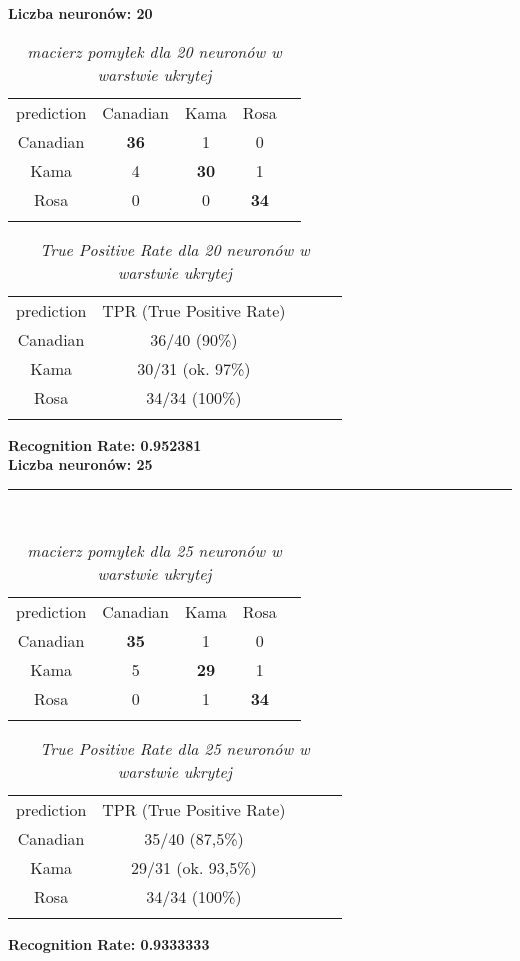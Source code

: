 \documentclass[a4paper,12pt]{article}
\newcommand{\linia}{\rule{\linewidth}{0.5pt}}
\theoremstyle{mytheor}
\begin{document}
\textbf{Liczba neuronów: 20}\\

\begin{table}[H]
\begin{tabular}{ccccc}
prediction & Canadian & Kama & Rosa  &  \\
Canadian & \textbf{36} & 1 & 0 &  \\
Kama & 4 & \textbf{30} & 1 &  \\
Rosa & 0 & 0 & \textbf{34} &  \\
&&&& 
\end{tabular}
\caption{\textit{macierz pomyłek dla 20 neuronów w warstwie ukrytej}}
\label{tab:7}
\end{table}
\begin{table}[H]
\begin{tabular}{ccccc}
prediction & TPR (True Positive Rate) &  \\
Canadian & 36/40 (90\%) & \\
Kama & 30/31 (ok. 97\%) & \\
Rosa & 34/34 (100\%) & \\
&&
\end{tabular}
\caption{\textit{True Positive Rate dla 20 neuronów w warstwie ukrytej}}
\label{tab:8}
\end{table}
\textbf{Recognition Rate: 0.952381} \\

\textbf{Liczba neuronów: 25}\\
\linia\\

\begin{table}[H]
\begin{tabular}{ccccc}
prediction & Canadian & Kama & Rosa  &  \\
Canadian & \textbf{35} & 1 & 0 &  \\
Kama & 5 & \textbf{29} & 1 &  \\
Rosa & 0 & 1 & \textbf{34} &  \\
&&&& 
\end{tabular}
\caption{\textit{macierz pomyłek dla 25 neuronów w warstwie ukrytej}}
\label{tab:9}
\end{table}
\begin{table}[H]
\begin{tabular}{ccccc}
prediction & TPR (True Positive Rate) &  \\
Canadian & 35/40 (87,5\%) & \\
Kama & 29/31 (ok. 93,5\%) & \\
Rosa & 34/34 (100\%) & \\
&&
\end{tabular}
\caption{\textit{True Positive Rate dla 25 neuronów w warstwie ukrytej}}
\label{tab:10}
\end{table}
\textbf{Recognition Rate: 0.9333333}
\end{document}
